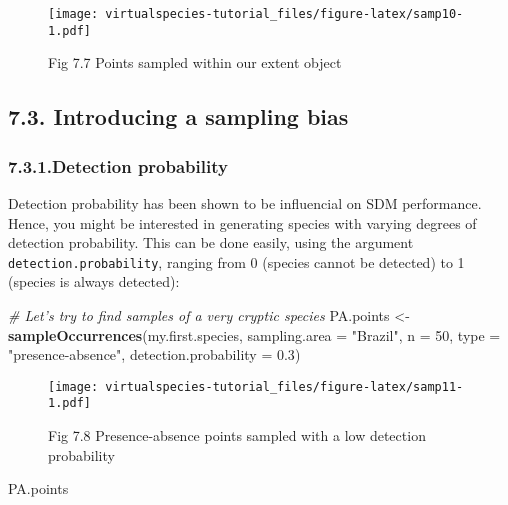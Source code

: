 \documentclass[]{article}
\newenvironment{Shaded}{\begin{snugshade}}{\end{snugshade}}
\newcommand{\KeywordTok}[1]{\textcolor[rgb]{0.13,0.29,0.53}{\textbf{#1}}}
\newcommand{\DataTypeTok}[1]{\textcolor[rgb]{0.13,0.29,0.53}{#1}}
\newcommand{\DecValTok}[1]{\textcolor[rgb]{0.00,0.00,0.81}{#1}}
\newcommand{\FloatTok}[1]{\textcolor[rgb]{0.00,0.00,0.81}{#1}}
\newcommand{\StringTok}[1]{\textcolor[rgb]{0.31,0.60,0.02}{#1}}
\newcommand{\CommentTok}[1]{\textcolor[rgb]{0.56,0.35,0.01}{\textit{#1}}}
\newcommand{\NormalTok}[1]{#1}
\begin{document}
\begin{figure}
\centering
\texttt{[image: virtualspecies-tutorial\_files/figure-latex/samp10-1.pdf]}
\caption{Fig 7.7 Points sampled within our extent object}
\end{figure}

\subsection{7.3. Introducing a sampling
bias}\label{introducing-a-sampling-bias}

\subsubsection{7.3.1.Detection probability}\label{detection-probability}

Detection probability has been shown to be influencial on SDM
performance. Hence, you might be interested in generating species with
varying degrees of detection probability. This can be done easily, using
the argument \texttt{detection.probability}, ranging from 0 (species
cannot be detected) to 1 (species is always detected):

\begin{Shaded}
\begin{Highlighting}[]
\CommentTok{# Let's try to find samples of a very cryptic species}
\NormalTok{PA.points <-}\StringTok{ }\KeywordTok{sampleOccurrences}\NormalTok{(my.first.species,}
                               \DataTypeTok{sampling.area =} \StringTok{"Brazil"}\NormalTok{,}
                               \DataTypeTok{n =} \DecValTok{50}\NormalTok{,}
                               \DataTypeTok{type =} \StringTok{"presence-absence"}\NormalTok{,}
                               \DataTypeTok{detection.probability =} \FloatTok{0.3}\NormalTok{)}
\end{Highlighting}
\end{Shaded}

\begin{figure}
\centering
\texttt{[image: virtualspecies-tutorial\_files/figure-latex/samp11-1.pdf]}
\caption{Fig 7.8 Presence-absence points sampled with a low detection
probability}
\end{figure}

\begin{Shaded}
\begin{Highlighting}[]
\NormalTok{PA.points}
\end{Highlighting}
\end{Shaded}
\end{document}

